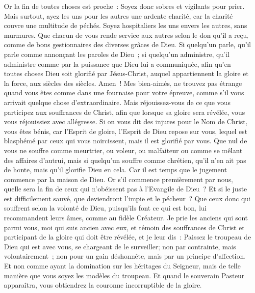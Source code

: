 \begin{multicols}{2}
Or la fin de toutes choses est proche~: Soyez donc sobres et vigilants pour prier.
Mais surtout, ayez les uns pour les autres une ardente charité, car la charité couvre une multitude de péchés.
Soyez hospitaliers les uns envers les autres, sans murmures.
Que chacun de vous rende service aux autres selon le don qu'il a reçu, comme de bons gestionnaires des diverses grâces de Dieu.
Si quelqu'un parle, qu'il parle comme annonçant les paroles de Dieu~; si quelqu'un administre, qu'il administre comme par la puissance que Dieu lui a communiquée, afin qu'en toutes choses Dieu soit glorifié par Jésus-Christ, auquel appartiennent la gloire et la force, aux siècles des siècles. Amen~!
Mes bien-aimés, ne trouvez pas étrange quand vous êtes comme dans une fournaise pour votre épreuve, comme s'il vous arrivait quelque chose d'extraordinaire.
Mais réjouissez-vous de ce que vous participez aux souffrances de Christ, afin que lorsque sa gloire sera révélée, vous vous réjouissiez avec allégresse.
Si on vous dit des injures pour le Nom de Christ, vous êtes bénis, car l'Esprit de gloire, l'Esprit de Dieu repose sur vous, lequel est blasphémé par ceux qui vous noircissent, mais il est glorifié par vous.
Que nul de vous ne souffre comme meurtrier, ou voleur, ou malfaiteur ou comme se mêlant des affaires d'autrui,
mais si quelqu'un souffre comme chrétien, qu'il n'en ait pas de honte, mais qu'il glorifie Dieu en cela.
Car il est temps que le jugement commence par la maison de Dieu. Or s'il commence premièrement par nous, quelle sera la fin de ceux qui n'obéissent pas à l'Evangile de Dieu~?
Et si le juste est difficilement sauvé, que deviendront l'impie et le pécheur~?
Que ceux donc qui souffrent selon la volonté de Dieu, puisqu'ils font ce qui est bon, lui recommandent leurs âmes, comme au fidèle Créateur.
\VerseOne{}Je prie les anciens qui sont parmi vous, moi qui suis ancien avec eux, et témoin des souffrances de Christ et participant de la gloire qui doit être révélée, et je leur dis~:
Paissez le troupeau de Dieu qui est avec vous, se chargeant de le surveiller; non par contrainte, mais volontairement~; non pour un gain déshonnête, mais par un principe d'affection.
Et non comme ayant la domination sur les héritages du Seigneur, mais de telle manière que vous soyez les modèles du troupeau.
Et quand le souverain Pasteur apparaîtra, vous obtiendrez la couronne incorruptible de la gloire.

\end{multicols}
